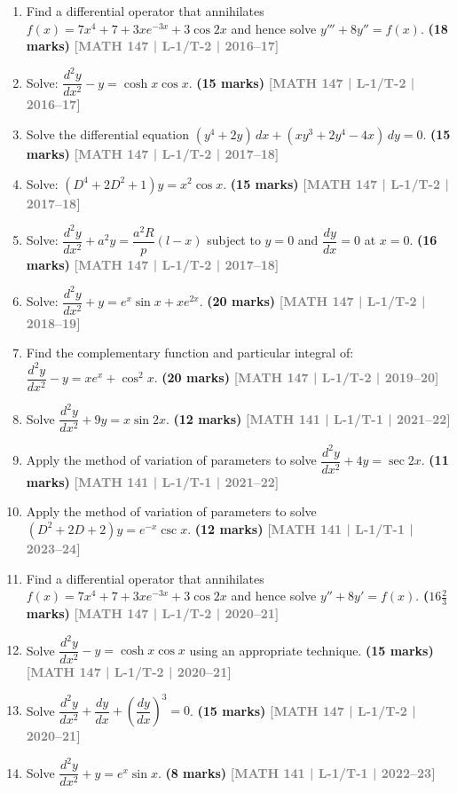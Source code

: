 \documentclass[12pt,a4paper]{article}
\newcommand{\yr}[1]{\hfill\textcolor{gray}{\small\textbf{[#1]}}}
\newcommand{\mk}[1]{\textcolor{orange!70!black}{\small\textbf{(#1 marks)}}}
\begin{document}
\begin{enumerate}
\item Find a differential operator that annihilates $f(x)=7x^{4}+7+3xe^{-3x}+3\cos 2x$ and hence solve $y'''+8y''=f(x)$.
\mk{18} \yr{MATH 147 | L-1/T-2 | 2016--17}

\item Solve: $\dfrac{d^{2}y}{dx^{2}}-y=\cosh x\cos x$.
\mk{15} \yr{MATH 147 | L-1/T-2 | 2016--17}

\item Solve the differential equation $(y^{4}+2y)\,dx+(xy^{3}+2y^{4}-4x)\,dy=0$.
\mk{15} \yr{MATH 147 | L-1/T-2 | 2017--18}

\item Solve: $(D^{4}+2D^{2}+1)y=x^{2}\cos x$.
\mk{15} \yr{MATH 147 | L-1/T-2 | 2017--18}

\item Solve: $\dfrac{d^{2}y}{dx^{2}}+a^{2}y=\dfrac{a^{2}R}{p}(l-x)$ subject to $y=0$ and $\dfrac{dy}{dx}=0$ at $x=0$.
\mk{16} \yr{MATH 147 | L-1/T-2 | 2017--18}

\item Solve: $\dfrac{d^{2}y}{dx^{2}}+y=e^{x}\sin x+xe^{2x}$.
\mk{20} \yr{MATH 147 | L-1/T-2 | 2018--19}

\item Find the complementary function and particular integral of: $\dfrac{d^{2}y}{dx^{2}}-y=xe^{x}+\cos^{2}x$.
\mk{20} \yr{MATH 147 | L-1/T-2 | 2019--20}

\item Solve $\dfrac{d^{2}y}{dx^{2}}+9y=x\sin 2x$.
\mk{12} \yr{MATH 141 | L-1/T-1 | 2021--22}

\item Apply the method of variation of parameters to solve $\dfrac{d^{2}y}{dx^{2}}+4y=\sec 2x$.
\mk{11} \yr{MATH 141 | L-1/T-1 | 2021--22}

\item Apply the method of variation of parameters to solve $(D^{2}+2D+2)y=e^{-x}\csc x$.
\mk{12} \yr{MATH 141 | L-1/T-1 | 2023--24}

\item Find a differential operator that annihilates $f(x)=7x^{4}+7+3xe^{-3x}+3\cos 2x$ and hence solve $y''+8y'=f(x)$.
\mk{$16\tfrac{2}{3}$} \yr{MATH 147 | L-1/T-2 | 2020--21}

\item Solve $\dfrac{d^{2}y}{dx^{2}}-y=\cosh x\cos x$ using an appropriate technique.
\mk{15} \yr{MATH 147 | L-1/T-2 | 2020--21}

\item Solve $\dfrac{d^{2}y}{dx^{2}}+\dfrac{dy}{dx}+\left(\dfrac{dy}{dx}\right)^{3}=0$.
\mk{15} \yr{MATH 147 | L-1/T-2 | 2020--21}

\item Solve $\dfrac{d^{2}y}{dx^{2}}+y=e^{x}\sin x$.
\mk{8} \yr{MATH 141 | L-1/T-1 | 2022--23}

\end{enumerate}
\end{document}
